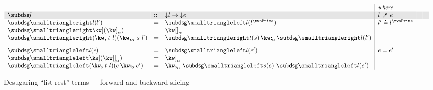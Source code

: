 \begin{figure}[H]
\small
$\begin{array}{lll|llll}
   \arrayrulecolor{lightgray}
   &&&\textit{where}
   \\
   \rowcolor{verylightgray}
   \desugarGC{l} &::& \Below{l} \to \Below{e}
   & l \desugarFwd e
   &&
   \\
   \desugarFwdF{l}(l')
   &=&
   \desugarBwdF{l}(l^\twoPrime)
   &
   l' \eq l^\twoPrime
   \\
   \desugarFwdF{\exListEnd}(\annot{\exListEnd}{\alpha})
   &=&
   \annot{\exNil}{\alpha}
   \\
   \desugarFwdF{(\exListNext{t}{l})}(\annListNext{s}{l'}{\alpha})
   &=&
   \annCons{\desugarFwdF{t}(s)}{\desugarFwdF{l}(l')}{\alpha}
   \\[3mm]
   \desugarBwdF{l}(e)
   &=&
   \desugarBwdF{l}(e')
   &
   e \eq e'
   \\
   \desugarBwdF{\exListEnd}(\annot{\exNil}{\alpha})
   &=&
   \annot{\exListEnd}{\alpha}
   \\
   \desugarBwdF{(\exListNext{t}{l})}(\annCons{e}{e'}{\alpha})
   &=&
   \annListNext{\desugarBwdF{s}(e)}{\desugarBwdF{l}(e')}{\alpha}
\end{array}$
\caption{Desugaring ``list rest'' terms --- forward and backward slicing}
\end{figure}
